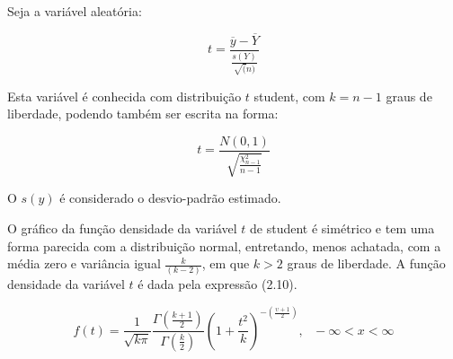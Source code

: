 Seja a variável aleatória:

\begin{equation}
    t =\frac{\overline{y}-\overline{Y}}{\frac{s(Y)}{\sqrt(n)}}
\end{equation}

Esta variável é conhecida com distribuição $t$ student, com $k=n-1$ graus de liberdade, podendo também ser escrita na forma:

\begin{equation}
    t =\frac{N(0,1)}{\sqrt{\frac{\chi^{2}_{n-1}}{n-1}}}
\end{equation}

O $s(y)$ é considerado o desvio-padrão estimado.\vskip0.3cm

O gráfico da função densidade da variável $t$ de student é simétrico e tem uma forma parecida com a distribuição normal, entretando, menos achatada, com a média zero e variância igual $\frac{k}{(k-2)}$, em que $k>2$ graus de liberdade. A função densidade da variável $t$ é dada pela expressão (2.10). 

\begin{equation}
f\left(t\right)=\frac{1}{\sqrt{k \pi}}\frac{\Gamma\left(\frac{k+1}{2}\right) }{\Gamma \left(\frac{k}{2}\right)}\left(1+\frac{t^2}{k}\right)^{-\left(\frac{\upsilon+1}{2}\right)},~~~-\infty<x<\infty
\end{equation}





















 